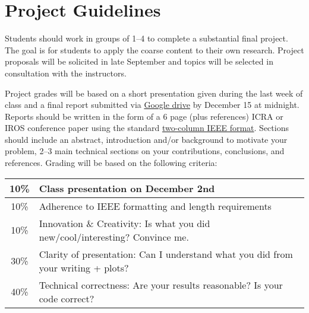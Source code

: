 \documentclass[11pt,letterpaper]{article}
\begin{document}
\section*{Project Guidelines}

Students should work in groups of 1--4 to complete a substantial final project. The goal is for students to apply the coarse content to their own research. Project proposals will be solicited in late September and topics will be selected in consultation with the instructors.

\medskip
\noindent
Project grades will be based on a short presentation given during the last week of class and a final report submitted via \href{https://forms.gle/6uj9E8XkzP8mAh6v9}{Google drive} by December 15 at midnight. Reports should be written in the form of a 6 page (plus references) ICRA or IROS conference paper using the standard \href{https://www.ieee.org/conferences/publishing/templates.html}{two-column IEEE format}. Sections should include an abstract, introduction and/or background to motivate your problem, 2--3 main technical sections on your contributions, conclusions, and references. Grading will be based on the following criteria:
\newline
\newline
\begin{tabular}{|c|l|}
\hline
10\% & Class presentation on December 2nd\\
\hline
10\% & Adherence to IEEE formatting and length requirements \\
\hline
10\% & Innovation \& Creativity: Is what you did new/cool/interesting? Convince me. \\
\hline
30\% & Clarity of presentation: Can I understand what you did from your writing + plots? \\
\hline
40\% & Technical correctness: Are your results reasonable? Is your code correct? \\
\hline	
\end{tabular}
\end{document}
